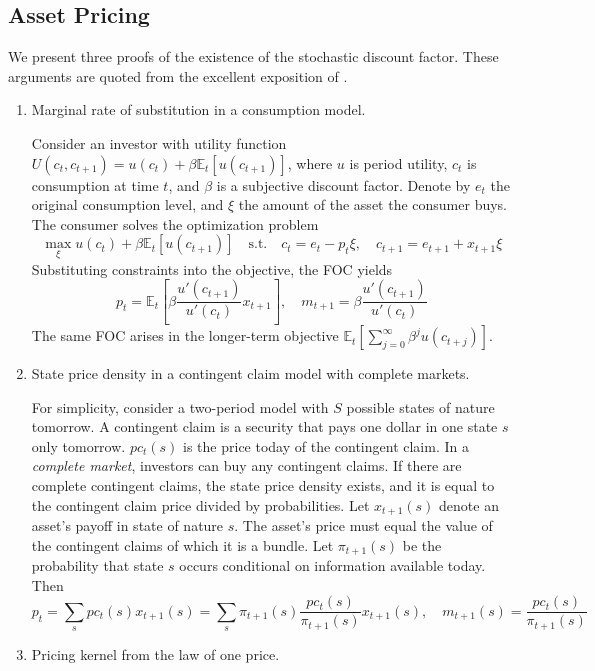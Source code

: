 \subsection{Asset Pricing}\label{sec:finance}

We present three proofs of the existence of the stochastic discount factor. These arguments are quoted from the excellent exposition of \cite{cochrane2009asset}.

\begin{enumerate}
   \item Marginal rate of substitution in a consumption model.
        
        Consider an investor with utility function $U(c_t,c_{t+1})=u(c_t)+\beta \mathbb{E}_t[u(c_{t+1})]$, where $u$ is period utility, $c_t$ is consumption at time $t$, and $\beta$ is a subjective discount factor. Denote by $e_t$ the original consumption level, and $\xi$ the amount of the asset the consumer buys. The consumer solves the optimization problem
        $$
        \max_{\xi} u(c_t)+\beta\mathbb{E}_t [u(c_{t+1})]\quad \text{s.t.}\quad c_t=e_t-p_t\xi,\quad c_{t+1}=e_{t+1}+x_{t+1}\xi
        $$
        Substituting constraints into the objective, the FOC yields
        $$
        p_t=\mathbb{E}_t\left[\beta \frac{u'(c_{t+1})}{u'(c_t)}x_{t+1}\right],\quad m_{t+1}=\beta \frac{u'(c_{t+1})}{u'(c_t)}
        $$
        The same FOC arises in the longer-term objective $\mathbb{E}_t \left[\sum_{j=0}^{\infty} \beta^j u(c_{t+j})\right]$.
     \item State price density in a contingent claim model with complete markets.
        
        For simplicity, consider a two-period model with $S$ possible states of nature tomorrow. A contingent claim is a security that pays one dollar in one state $s$ only tomorrow. $pc_t(s)$ is the price today of the contingent claim. In a \textit{complete market}, investors can buy any contingent claims. If there are complete contingent claims, the state price density exists, and it is equal to the contingent claim price divided by probabilities. Let $x_{t+1}(s)$ denote an asset's payoff in state of nature $s$. The asset's price must equal the value of the contingent claims of which it is a bundle. Let $\pi_{t+1}(s)$ be the probability that state $s$ occurs conditional on information available today. Then
        $$
        p_t=\sum_s pc_t(s) x_{t+1}(s)=\sum_s \pi_{t+1}(s) \frac{pc_t(s)}{\pi_{t+1}(s)} x_{t+1}(s),\quad m_{t+1}(s)=\frac{pc_t(s)}{\pi_{t+1}(s)}
        $$
    \item Pricing kernel from the law of one price.
    

\end{enumerate}
